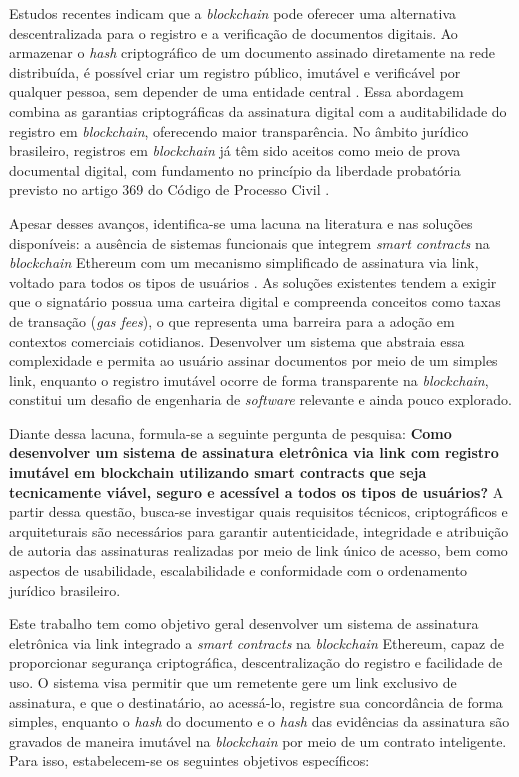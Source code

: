 \documentclass[
    12pt,
    a4paper,
    oneside,
    chapter=TITLE,
    section=TITLE,
    subsection=TITLE,
    subsubsection=TITLE,
    sumario=tradicional,
    english,
    brazil
]{abntex2}
\begin{document}
Estudos recentes indicam que a \emph{blockchain} pode oferecer uma
alternativa descentralizada para o registro e a verificação de
documentos digitais. Ao armazenar o \emph{hash} criptográfico de um
documento assinado diretamente na rede distribuída, é possível criar
um registro público, imutável e verificável por qualquer pessoa, sem
depender de uma entidade central \cite{zheng2018}. Essa abordagem
combina as garantias criptográficas da assinatura digital com a
auditabilidade do registro em \emph{blockchain}, oferecendo maior
transparência. No âmbito jurídico brasileiro, registros em
\emph{blockchain} já têm sido aceitos como meio de prova documental
digital, com fundamento no princípio da liberdade probatória previsto
no artigo 369 do Código de Processo Civil \cite{brasil2015}.

Apesar desses avanços, identifica-se uma lacuna na literatura e nas
soluções disponíveis: a ausência de sistemas funcionais que integrem
\emph{smart contracts} na \emph{blockchain} Ethereum com um mecanismo
simplificado de assinatura via link, voltado para todos os tipos de
usuários \cite{buterin2014, alharby2017}. As soluções existentes
tendem a exigir que o signatário possua uma carteira digital e
compreenda conceitos como taxas de transação (\emph{gas fees}), o
que representa uma barreira para a adoção em contextos comerciais
cotidianos. Desenvolver um sistema que abstraia essa complexidade e
permita ao usuário assinar documentos por meio de um simples link,
enquanto o registro imutável ocorre de forma transparente na
\emph{blockchain}, constitui um desafio de engenharia de
\emph{software} relevante e ainda pouco explorado.

Diante dessa lacuna, formula-se a seguinte pergunta de pesquisa:
\textbf{Como desenvolver um sistema de assinatura eletrônica via link
com registro imutável em blockchain utilizando smart contracts que
seja tecnicamente viável, seguro e acessível a todos os tipos de
usuários?} A partir dessa questão, busca-se investigar quais
requisitos técnicos, criptográficos e arquiteturais são necessários
para garantir autenticidade, integridade e atribuição de autoria
das assinaturas realizadas por meio de link único de acesso, bem como
aspectos de usabilidade, escalabilidade e conformidade com o
ordenamento jurídico brasileiro.

Este trabalho tem como objetivo geral desenvolver um sistema de
assinatura eletrônica via link integrado a \emph{smart contracts} na
\emph{blockchain} Ethereum, capaz de proporcionar segurança
criptográfica, descentralização do registro e facilidade de uso. O
sistema visa permitir que um remetente gere um link exclusivo de
assinatura, e que o destinatário, ao acessá-lo, registre sua
concordância de forma simples, enquanto o \emph{hash} do documento e
o \emph{hash} das evidências da assinatura são gravados de maneira imutável na
\emph{blockchain} por meio de um contrato inteligente. Para isso,
estabelecem-se os seguintes objetivos específicos:
\end{document}
